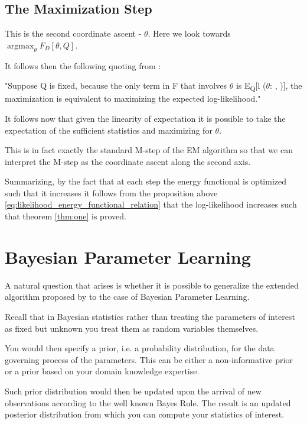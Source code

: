 \documentclass[11pt]{article}
\begin{document}
\begin{article}
\subsection{The Maximization Step}
\label{sec:orgc9c3389}

This is the second coordinate ascent - \(\theta\). Here we look
towards \(\operatorname*{argmax}_{\theta} F_D[\theta, Q]\).

It follows then the following quoting from
\cite{koller2009probabilistic}:

"Suppose Q is fixed, because the only term in F that involves \(\theta\) is
E\textsubscript{Q}[l (\(\theta\): , )], the maximization is
equivalent to maximizing the expected log-likelihood."

It follows now that given the linearity of expectation it is
possible to take the expectation of the sufficient statistics and
maximizing for \(\theta\).

This is in fact exactly the standard M-step of the EM algorithm so
that we can interpret the M-step as the coordinate ascent along
the second axis.

Summarizing, by the fact that at each step the energy functional is optimized
such that it increases it follows from the proposition above
\ref{eq:likelihood_energy_functional_relation} that the log-likelihood
increases such that theorem \ref{thm:one} is proved.

\section{Bayesian Parameter Learning}
\label{sec:org85aadd1}

A natural question that arises is whether it is possible to
generalize the extended algorithm proposed by \cite{Mrad_2015} to the
case of Bayesian Parameter Learning.

Recall that in Bayesian statistics rather than treating the
parameters of interest as fixed but unknown you treat them as random
variables themselves.

You would then specify a prior, i.e. a probability distribution, for
the data governing process of the parameters. This can be either a
non-informative prior or a prior based on your domain knowledge
expertise.

Such prior distribution would then be updated upon the arrival of
new observations according to the well known Bayes Rule. The result
is an updated posterior distribution from which you can compute your
statistics of interest.



\end{article}
\end{document}
